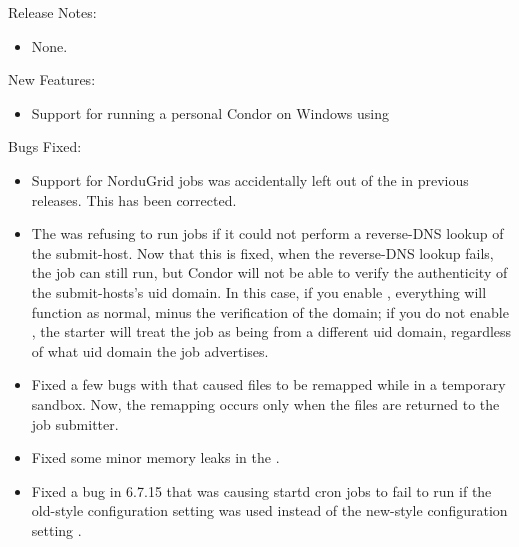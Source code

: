 \noindent Release Notes:

\begin{itemize}

\item None.

\end{itemize}


\noindent New Features:

\begin{itemize}

\item Support for running a personal Condor on Windows using
 

\end{itemize}

\noindent Bugs Fixed:

\begin{itemize}

\item Support for NorduGrid jobs was accidentally left out of the
 in previous releases. This has been corrected.

\item The  was refusing to run jobs if it could not
perform a reverse-DNS lookup of the submit-host.  Now that this is
fixed, when the reverse-DNS lookup fails, the job can still run, but
Condor will not be able to verify the authenticity of the
submit-hosts's uid domain.  In this case, if you enable
, everything will function as normal, minus
the verification of the domain; if you do not enable
, the starter will treat the job as being
from a different uid domain, regardless of what uid domain the job
advertises.

\item Fixed a few bugs with  that caused
files to be remapped while in a temporary sandbox. Now, the remapping
occurs only when the files are returned to the job submitter.

\item Fixed some minor memory leaks in the .

\item Fixed a bug in 6.7.15 that was causing startd cron jobs to fail to run
if the old-style configuration setting  was used
instead of the new-style configuration setting .

\end{itemize}

